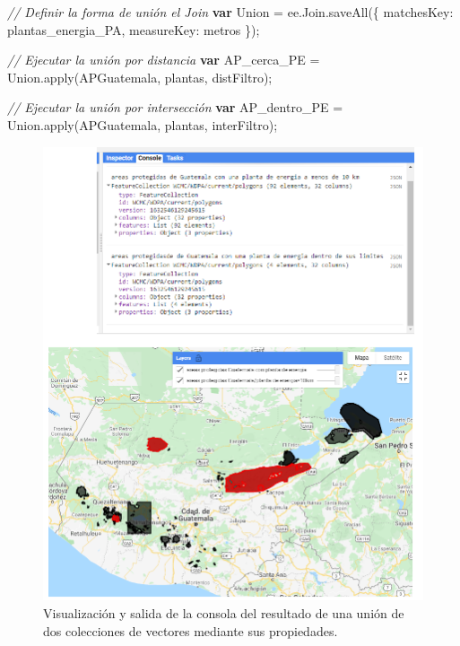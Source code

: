 \documentclass[
  12pt,
  letterpaper,
  twoside]{book}
\newenvironment{Shaded}{\begin{snugshade}}{\end{snugshade}}
\newcommand{\AttributeTok}[1]{\textcolor[rgb]{0.48,0.12,0.64}{#1}}
\newcommand{\CommentTok}[1]{\textcolor[rgb]{0.24,0.58,0.00}{\textit{#1}}}
\newcommand{\DataTypeTok}[1]{\textcolor[rgb]{0.00,0.00,0.00}{#1}}
\newcommand{\FunctionTok}[1]{\textcolor[rgb]{0.48,0.12,0.64}{#1}}
\newcommand{\KeywordTok}[1]{\textcolor[rgb]{0.00,0.00,0.00}{\textbf{#1}}}
\newcommand{\NormalTok}[1]{#1}
\newcommand{\OperatorTok}[1]{\textcolor[rgb]{0.00,0.00,0.00}{#1}}
\newcommand{\StringTok}[1]{\textcolor[rgb]{0.87,0.29,0.22}{#1}}
\begin{document}
\begin{Shaded}
\begin{Highlighting}[]
\CommentTok{// Definir la forma de unión el Join}
\KeywordTok{var}\NormalTok{ Union }\OperatorTok{=}\NormalTok{ ee}\OperatorTok{.}\AttributeTok{Join}\OperatorTok{.}\FunctionTok{saveAll}\NormalTok{(\{}
  \DataTypeTok{matchesKey}\OperatorTok{:} \StringTok{\textquotesingle{}plantas\_energia\_PA\textquotesingle{}}\OperatorTok{,}
  \DataTypeTok{measureKey}\OperatorTok{:} \StringTok{\textquotesingle{}metros\textquotesingle{}}
\NormalTok{\})}\OperatorTok{;}

\CommentTok{// Ejecutar la unión por distancia}
\KeywordTok{var}\NormalTok{ AP\_cerca\_PE }\OperatorTok{=}\NormalTok{ Union}\OperatorTok{.}\FunctionTok{apply}\NormalTok{(APGuatemala}\OperatorTok{,}\NormalTok{ plantas}\OperatorTok{,}\NormalTok{ distFiltro)}\OperatorTok{;}

\CommentTok{// Ejecutar la unión por intersección}
\KeywordTok{var}\NormalTok{ AP\_dentro\_PE }\OperatorTok{=}\NormalTok{ Union}\OperatorTok{.}\FunctionTok{apply}\NormalTok{(APGuatemala}\OperatorTok{,}\NormalTok{ plantas}\OperatorTok{,}\NormalTok{ interFiltro)}\OperatorTok{;}
\end{Highlighting}
\end{Shaded}

\begin{figure}[H]

{\centering \includegraphics[width=0.95\linewidth]{Img/ej25} 

}

\caption{Visualización y salida de la consola del resultado de una unión de dos colecciones de vectores mediante sus propiedades.}\label{fig:f813}
\end{figure}
\end{document}
